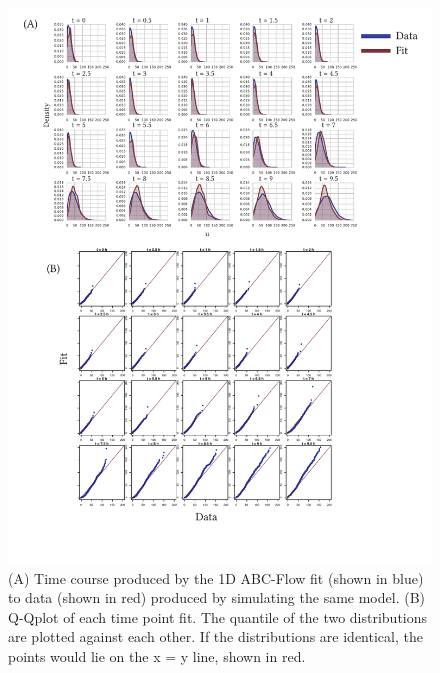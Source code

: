 
\begin{figure}[htbp]
\centering
	\includegraphics[scale=0.9]{../../chapters/chapterABCFlow/images/1D_sim_res.pdf}
	\caption[ABC-Flow parameter inference for 1D simulated data]{\label{fig:1d-sim-res} (A) Time course produced by the 1D ABC-Flow fit (shown in blue) to data (shown in red) produced by simulating the same model. (B) Q-Qplot of each time point fit. The quantile of the two distributions are plotted against each other. If the distributions are identical, the points would lie on the x = y line, shown in red. }
\end{figure}






